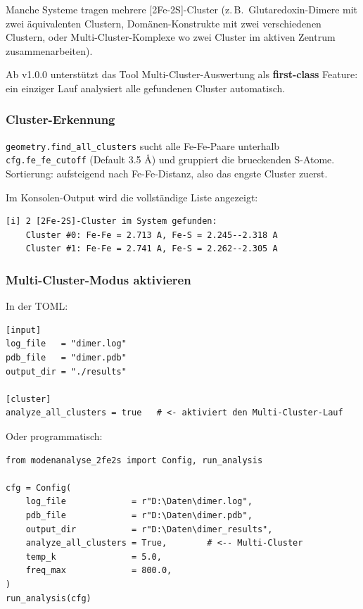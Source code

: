 \documentclass[11pt,a4paper,twoside]{article}
\theoremstyle{remark}
\begin{document}
Manche Systeme tragen mehrere {[}2Fe-2S{]}-Cluster (z.\,B.\
Glutaredoxin-Dimere mit zwei \"aquivalenten Clustern, Dom\"anen-Konstrukte
mit zwei verschiedenen Clustern, oder Multi-Cluster-Komplexe wo zwei
Cluster im aktiven Zentrum zusammenarbeiten).

Ab v1.0.0 unterst\"utzt das Tool Multi-Cluster-Auswertung als
\textbf{first-class} Feature: ein einziger Lauf analysiert alle gefundenen
Cluster automatisch.

\subsubsection*{Cluster-Erkennung}

\texttt{geometry.find\_all\_clusters} sucht alle Fe-Fe-Paare unterhalb
\texttt{cfg.fe\_fe\_cutoff} (Default 3.5 \AA{}) und gruppiert die
brueckenden S-Atome. Sortierung: aufsteigend nach Fe-Fe-Distanz, also
das engste Cluster zuerst.

Im Konsolen-Output wird die vollst\"andige Liste angezeigt:

\begin{lstlisting}[style=bash]
[i] 2 [2Fe-2S]-Cluster im System gefunden:
    Cluster #0: Fe-Fe = 2.713 A, Fe-S = 2.245--2.318 A
    Cluster #1: Fe-Fe = 2.741 A, Fe-S = 2.262--2.305 A
\end{lstlisting}

\subsubsection*{Multi-Cluster-Modus aktivieren}

In der TOML:

\begin{lstlisting}[style=python]
[input]
log_file   = "dimer.log"
pdb_file   = "dimer.pdb"
output_dir = "./results"

[cluster]
analyze_all_clusters = true   # <- aktiviert den Multi-Cluster-Lauf
\end{lstlisting}

Oder programmatisch:

\begin{lstlisting}[style=python]
from modenanalyse_2fe2s import Config, run_analysis

cfg = Config(
    log_file             = r"D:\Daten\dimer.log",
    pdb_file             = r"D:\Daten\dimer.pdb",
    output_dir           = r"D:\Daten\dimer_results",
    analyze_all_clusters = True,        # <-- Multi-Cluster
    temp_k               = 5.0,
    freq_max             = 800.0,
)
run_analysis(cfg)
\end{lstlisting}
\end{document}
